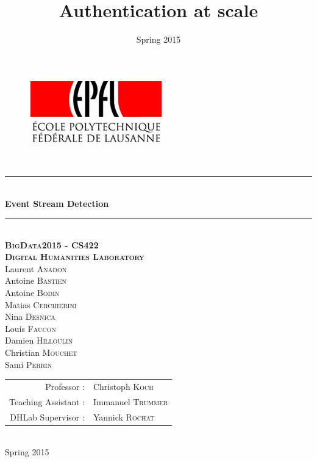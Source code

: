 \documentclass[a4paper, 11pt]{article}
\title{Authentication at scale}
\author{ }
\date{Spring 2015}
\newcommand{\HRule}{\rule{\linewidth}{0.5mm}}
\begin{document}

\begin{titlepage}
\begin{center}

\begin{figure}[h] 
\begin{center}
\begin{minipage}[c]{.45\linewidth}
\begin{center}
\includegraphics[scale=1]{images/logoEPFL.png}
\end{center}
\end{minipage}
\end{center}
\end{figure}

\hfill \\[2cm]
\HRule \\[0.5cm]
{ \Huge \bfseries Event Stream Detection}\\[0.5cm]

\HRule \\[2cm]
\makeatletter
\renewcommand{\thesection}{\@arabic\c@section}
\makeatother
\textsc{\textbf{\Large BigData2015 - CS422\\ Digital Humanities Laboratory}}\\[2cm]


\large Laurent \textsc{Anadon}\\
\large Antoine \textsc{Bastien}\\
\large Antoine \textsc{Bodin}\\
\large Matias \textsc{Cerchierini}\\
\large Nina \textsc{Desnica}\\
\large Louis \textsc{Faucon}\\
\large Damien \textsc{Hilloulin}\\
\large Christian \textsc{Mouchet}\\
\large Sami \textsc{Perrin}\\[2cm]


\begin{tabular}{rl}
Professor : &Christoph \textsc{Koch}\\
Teaching Assistant : &Immanuel \textsc{Trummer}\\
DHLab Supervisor : &Yannick \textsc{Rochat}
\end{tabular}

\hfill \\[1cm]
{\large Spring 2015}
\end{center}
\end{titlepage}

\restoregeometry
\tableofcontents
\newpage



\newpage


\newpage


\newpage


\newpage


\newpage



\newpage

 

\end{document}
